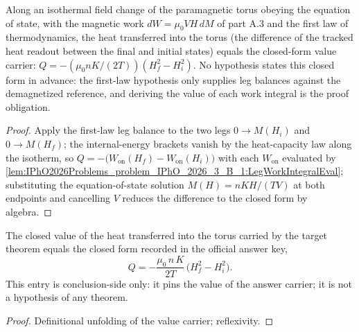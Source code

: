 \begin{theorem}
\label{thm:IPhO2026Problems_problem_IPhO_2026_3_B_1:IsothermalHeatIntoTorus}
Along an isothermal field change of the paramagnetic torus obeying the
equation of state, with the magnetic work $dW = \mu_0 V H\,dM$ of part A.3
and the first law of thermodynamics, the heat transferred into the torus
(the difference of the tracked heat readout between the final and initial
states) equals the closed-form value carrier:
$Q = -(\mu_0 n K/(2T))(H_f^2 - H_i^2)$.  No hypothesis states this closed
form in advance: the first-law hypothesis only supplies leg balances
against the demagnetized reference, and deriving the value of each work
integral is the proof obligation.
\end{theorem}
\begin{proof}
Apply the first-law leg balance to the two legs $0 \to M(H_i)$ and
$0 \to M(H_f)$; the internal-energy brackets vanish by the heat-capacity
law along the isotherm, so
$Q = -\bigl(W_{\mathrm{on}}(H_f) - W_{\mathrm{on}}(H_i)\bigr)$ with each
$W_{\mathrm{on}}$ evaluated by
\cref{lem:IPhO2026Problems_problem_IPhO_2026_3_B_1:LegWorkIntegralEval};
substituting the equation-of-state solution
$M(H) = n K H /(T V)$ at both endpoints and cancelling $V$ reduces the
difference to the closed form by algebra.
\end{proof}

\begin{theorem}
\label{thm:IPhO2026Problems_problem_IPhO_2026_3_B_1:OfficialAnswerValue}
The closed value of the heat transferred into the torus carried by the
target theorem equals the closed form recorded in the official answer key,
\[
Q = -\frac{\mu_0\,n\,K}{2 T}\,\bigl(H_f^2 - H_i^2\bigr).
\]
This entry is conclusion-side only: it pins the value of the answer
carrier; it is not a hypothesis of any theorem.
\end{theorem}
\begin{proof}
Definitional unfolding of the value carrier; reflexivity.
\end{proof}
